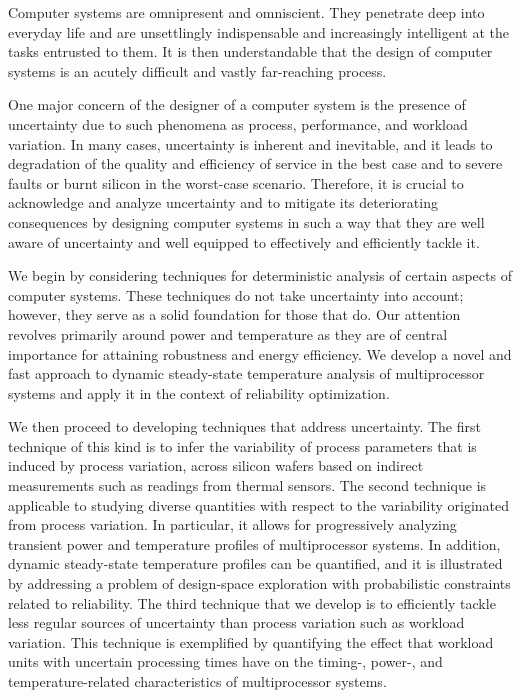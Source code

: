 Computer systems are omnipresent and omniscient. They penetrate deep into
everyday life and are unsettlingly indispensable and increasingly intelligent at
the tasks entrusted to them. It is then understandable that the design of
computer systems is an acutely difficult and vastly far-reaching process.

One major concern of the designer of a computer system is the presence of
uncertainty due to such phenomena as process, performance, and workload
variation. In many cases, uncertainty is inherent and inevitable, and it leads
to degradation of the quality and efficiency of service in the best case and to
severe faults or burnt silicon in the worst-case scenario. Therefore, it is
crucial to acknowledge and analyze uncertainty and to mitigate its deteriorating
consequences by designing computer systems in such a way that they are well
aware of uncertainty and well equipped to effectively and efficiently tackle it.

We begin by considering techniques for deterministic analysis of certain aspects
of computer systems. These techniques do not take uncertainty into account;
however, they serve as a solid foundation for those that do. Our attention
revolves primarily around power and temperature as they are of central
importance for attaining robustness and energy efficiency. We develop a novel
and fast approach to dynamic steady-state temperature analysis of multiprocessor
systems and apply it in the context of reliability optimization.

We then proceed to developing techniques that address uncertainty. The first
technique of this kind is to infer the variability of process parameters that is
induced by process variation, across silicon wafers based on indirect
measurements such as readings from thermal sensors. The second technique is
applicable to studying diverse quantities with respect to the variability
originated from process variation. In particular, it allows for progressively
analyzing transient power and temperature profiles of multiprocessor systems. In
addition, dynamic steady-state temperature profiles can be quantified, and it is
illustrated by addressing a problem of design-space exploration with
probabilistic constraints related to reliability. The third technique that we
develop is to efficiently tackle less regular sources of uncertainty than
process variation such as workload variation. This technique is exemplified by
quantifying the effect that workload units with uncertain processing times have
on the timing-, power-, and temperature-related characteristics of
multiprocessor systems.

